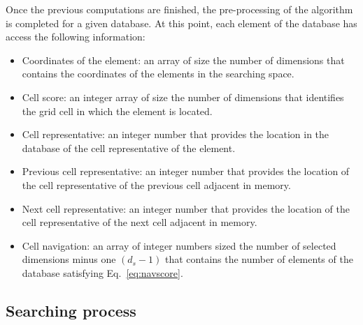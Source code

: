 \documentclass[review]{elsarticle}
\begin{document}
Once the previous computations are finished, the pre-processing of the algorithm is completed for a given database. At this point, each element of the database has access the following information:
\begin{itemize}
	\item Coordinates of the element: an array of size the number of dimensions that contains the coordinates of the elements in the searching space.
	\item Cell score: an integer array of size the number of dimensions that identifies the grid cell in which the element is located.
	\item Cell representative: an integer number that provides the location in the database of the cell representative of the element.
	\item Previous cell representative: an integer number that provides the location of the cell representative of the previous cell adjacent in memory.
	\item Next cell representative: an integer number that provides the location of the cell representative of the next cell adjacent in memory.
	\item Cell navigation: an array of integer numbers sized the number of selected dimensions minus one $(d_s - 1)$ that contains the number of elements of the database satisfying Eq.~\eqref{eq:navscore}.
\end{itemize}


\subsection{Searching process}
\label{sec:search}
\end{document}
